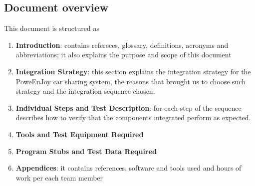 \subsection{Document overview}
This document is structured as
\begin{enumerate}
	\item \textbf{Introduction}: contains refereces, glossary, definitions, acronyms and abbreviations; it also explains the purpose and scope of this document
	\item \textbf{Integration Strategy}: this section explains the integration strategy for the PoweEnJoy car sharing system, the reasons that brought us to choose such strategy and the integration sequence chosen.
	\item \textbf{Individual Steps and Test Description}: for each step of the sequence describes how to verify that the components integrated perform as expected.
	\item \textbf{Tools and Test Equipment Required}
	\item \textbf{Program Stubs and Test Data Required}
	\item \textbf{Appendices}: it contains references, software and tools used and hours of work per each team member
\end{enumerate}